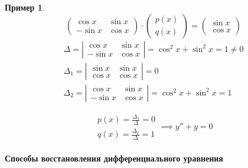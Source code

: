 \documentclass[11pt,a4paper,oneside]{report}
\theoremstyle{definition}
\newtheorem{example}{Пример}
\theoremstyle{plain}
\theoremstyle{remark}
\begin{document}
\begin{example}
    \begin{equation*}
        \begin{pmatrix}
            \cos x & \sin x \\ -\sin x & \cos x
        \end{pmatrix} \cdot \begin{pmatrix}
            p(x) \\ q(x)
        \end{pmatrix} = \begin{pmatrix}
            \sin x \\ \cos x
        \end{pmatrix}
    \end{equation*}
    \begin{equation*}
        \begin{array}{l}
            \Delta = \left|\begin{array}{cc}
                               \cos x & \sin x \\ -\sin x & \cos x
                           \end{array}\right| = \cos^2 x + \sin^2 x = 1 \ne 0 \\
            \Delta_1 = \left|\begin{array}{cc}
                                 \sin x & \sin x \\ \cos x & \cos x
                             \end{array}\right| = 0                \\
            \Delta_2 = \left|\begin{array}{cc}
                                 \cos x & \sin x \\ -\sin x & \cos x
                             \end{array}\right| = \cos^2 x + \sin^2x = 1
        \end{array}
    \end{equation*}

    \begin{equation*}
        \begin{array}{l}
            p(x) = \frac{\Delta_1}{\Delta} = 0 \\
            q(x) = \frac{\Delta_2}{\Delta} = 1
        \end{array} \implies y'' + y = 0
    \end{equation*}
\end{example}

\paragraph*{Способы восстановления дифференциального уравнения}
\end{document}
